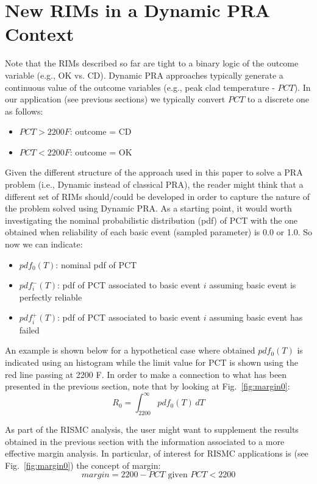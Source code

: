 \section{New RIMs in a Dynamic PRA Context}
\label{sec:newRIM}

Note that the RIMs described so far are tight to a binary logic of the outcome 
variable (e.g., OK vs. CD). Dynamic PRA approaches typically generate a continuous 
value of the outcome variables (e.g., peak clad temperature - $PCT$). 
In our application (see previous sections) we typically convert $PCT$ to a discrete 
one as follows:
\begin{itemize}
  \item $PCT>2200 F$: outcome = CD
  \item $PCT<2200 F$: outcome = OK
\end{itemize}
  
Given the different structure of the approach used in this paper to solve a PRA 
problem (i.e., Dynamic instead of classical PRA), the reader might think that a different 
set of RIMs should/could be developed in order to capture the nature of the problem 
solved using Dynamic PRA.
As a starting point, it would worth investigating the nominal probabilistic distribution 
(pdf) of PCT with the one obtained when reliability of each basic event (sampled parameter) 
is 0.0 or 1.0. So now we can indicate:
\begin{itemize}
  \item $pdf_0 (T)$: nominal pdf of PCT
  \item $pdf_i^-(T)$: pdf of PCT associated to basic event $i$ assuming basic event is perfectly 
        reliable
  \item $pdf_i^+(T)$: pdf of PCT associated to basic event $i$ assuming basic event has failed
\end{itemize}

An example is shown below for a hypothetical case where obtained $pdf_0(T)$ is indicated 
using an histogram while the limit value for PCT is shown using the red line passing at 2200 F.
In order to make a connection to what has been presented in the previous section, note that by 
looking at Fig.~\ref{fig:margin0}:
\begin{equation}
  R_0 = \int_{2200}^\infty \! pdf_0(T) \, dT
  \label{eq:R0}
\end{equation}

As part of the RISMC analysis, the user might want to supplement the results obtained in the 
previous section with the information associated to a more effective margin analysis.
In particular, of interest for RISMC applications is (see Fig.~\ref{fig:margin0}) the concept of margin:
\begin{equation}
  margin= 2200-PCT \text{ given } PCT<2200
  \label{eq:margin}
\end{equation}

